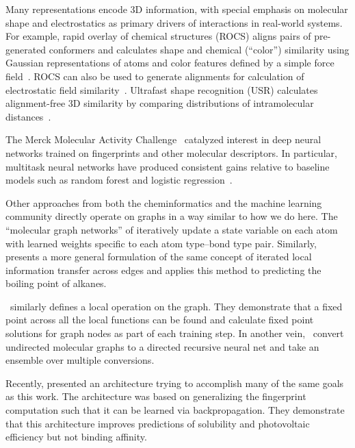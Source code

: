 Many representations encode 3D information, with special emphasis on molecular
shape and electrostatics as primary drivers of interactions in
real-world systems. For example, rapid overlay of chemical structures
(ROCS) aligns pairs of pre-generated conformers and calculates shape and
chemical (``color'') similarity using Gaussian representations of atoms and
color features defined by a simple force field~\citep{hawkins2007comparison}. ROCS can
also be used to generate alignments for calculation of electrostatic field
similarity~\citep{muchmore2006use}. Ultrafast shape recognition (USR) calculates
alignment-free 3D similarity by comparing distributions of intramolecular
distances~\citep{ballester2007ultrafast}.

The Merck Molecular Activity Challenge~\citep{dahl2012deep} catalyzed interest
in deep neural networks trained on fingerprints and other molecular descriptors.
In particular, multitask neural networks have produced consistent gains relative
to baseline models such as random forest and logistic
regression~\citep{dahl2014multi, ma2015deep, mayr2015deeptox,
ramsundar2015massively}.

Other approaches from both the cheminformatics and the machine learning
community directly operate on graphs in a way similar to how we do here. The ``molecular
graph networks'' of \citet{merkwirth2005automatic} iteratively update a state
variable on each atom with learned weights specific to each atom type--bond type
pair. Similarly, \citet{micheli2009neural} presents a more
general formulation of the same concept of iterated local information transfer
across edges and applies this method to predicting the boiling point of alkanes.

\citet{scarselli2009graph}~similarly defines a local operation on the graph.
They demonstrate that a fixed point
across all the local functions can be found and calculate fixed point solutions
for graph nodes as part of each training step. In another
vein,~\citet{lusci2013deep} convert undirected molecular graphs to a directed
recursive neural net and take an ensemble over multiple conversions.

Recently, \citet{duvenaud2015convolutional} presented an architecture
trying to accomplish many of the same goals as this work. The architecture was
based on generalizing the fingerprint computation such that it can be learned
via backpropagation. They demonstrate that this architecture improves
predictions of solubility and photovoltaic efficiency but not binding affinity.

